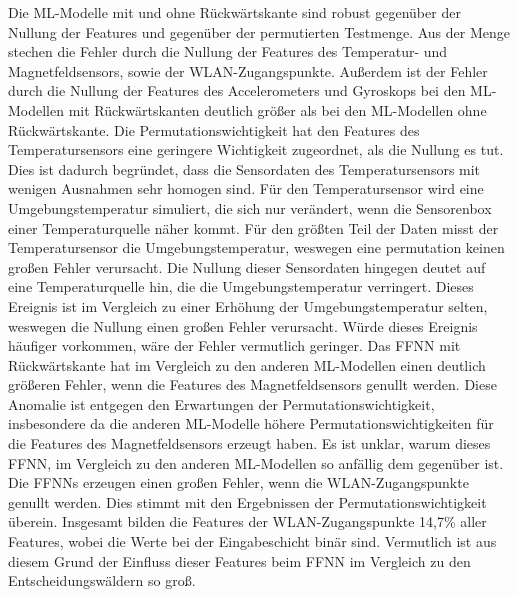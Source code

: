 \newline
\newline
Die ML-Modelle mit und ohne Rückwärtskante sind robust gegenüber der Nullung der Features und gegenüber der permutierten Testmenge.
Aus der Menge stechen die Fehler durch die Nullung der Features des Temperatur- und Magnetfeldsensors, sowie der WLAN-Zugangspunkte.
Außerdem ist der Fehler durch die Nullung der Features des Accelerometers und Gyroskops bei den ML-Modellen mit Rückwärtskanten
deutlich größer als bei den ML-Modellen ohne Rückwärtskante.
\newline
\newline
Die Permutationswichtigkeit hat den Features des Temperatursensors eine geringere Wichtigkeit zugeordnet, als die Nullung es tut.
Dies ist dadurch begründet, dass die Sensordaten des Temperatursensors mit wenigen Ausnahmen sehr homogen sind.
Für den Temperatursensor wird eine Umgebungstemperatur simuliert, die sich nur verändert, wenn die Sensorenbox einer Temperaturquelle näher kommt.
Für den größten Teil der Daten misst der Temperatursensor die Umgebungstemperatur, weswegen eine permutation keinen großen Fehler verursacht.
Die Nullung dieser Sensordaten hingegen deutet auf eine Temperaturquelle hin, die die Umgebungstemperatur verringert.
Dieses Ereignis ist im Vergleich zu einer Erhöhung der Umgebungstemperatur selten, weswegen die Nullung einen großen Fehler verursacht.
Würde dieses Ereignis häufiger vorkommen, wäre der Fehler vermutlich geringer.
\newline
\newline
Das FFNN mit Rückwärtskante hat im Vergleich zu den anderen ML-Modellen einen deutlich größeren Fehler, wenn die Features des Magnetfeldsensors genullt werden.
Diese Anomalie ist entgegen den Erwartungen der Permutationswichtigkeit, insbesondere da die anderen ML-Modelle
höhere Permutationswichtigkeiten für die Features des Magnetfeldsensors erzeugt haben.
Es ist unklar, warum dieses FFNN, im Vergleich zu den anderen ML-Modellen so anfällig dem gegenüber ist.
\newline
\newline
Die FFNNs erzeugen einen großen Fehler, wenn die WLAN-Zugangspunkte genullt werden.
Dies stimmt mit den Ergebnissen der Permutationswichtigkeit überein.
Insgesamt bilden die Features der WLAN-Zugangspunkte 14,7\% aller Features, wobei die Werte bei der Eingabeschicht binär sind.
Vermutlich ist aus diesem Grund der Einfluss dieser Features beim FFNN im Vergleich zu den Entscheidungswäldern so groß.
\newline
